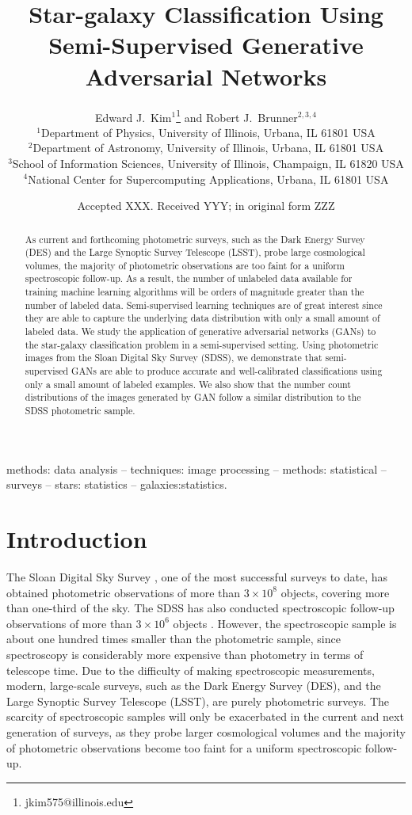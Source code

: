 \documentclass[fleqn,usenatbib]{mnras}
\title[Star-galaxy Classification Using GANs]{Star-galaxy Classification Using Semi-Supervised Generative Adversarial Networks}
\author[E. J. Kim and R. J. Brunner]{
  Edward J.~Kim$^1$\thanks{jkim575@illinois.edu} and Robert J.~Brunner$^{2,3,4}$ \\
$^1$Department of Physics, University of Illinois, Urbana, IL 61801 USA\\
$^2$Department of Astronomy, University of Illinois, Urbana, IL 61801 USA\\
$^3$School of Information Sciences, University of Illinois, Champaign, IL 61820 USA\\
$^4$National Center for Supercomputing Applications, Urbana, IL 61801 USA\\
}
\date{Accepted XXX. Received YYY; in original form ZZZ}
\begin{document}
\label{firstpage}
\pagerange{\pageref{firstpage}--\pageref{lastpage}}
\maketitle

\begin{abstract}
As current and forthcoming photometric surveys, such as the Dark Energy Survey (DES) and the Large Synoptic Survey Telescope (LSST),
probe large cosmological volumes, the majority of photometric observations are too faint for a uniform spectroscopic follow-up.
As a result, the number of unlabeled data available for training machine learning algorithms will be orders of magnitude
greater than the number of labeled data.
Semi-supervised learning techniques are of great interest since they are able to capture the underlying data distribution
with only a small amount of labeled data.
We study the application of generative adversarial networks (GANs) to the star-galaxy classification problem
in a semi-supervised setting.
Using photometric images from the Sloan Digital Sky Survey (SDSS), we demonstrate that semi-supervised GANs are able to produce
accurate and well-calibrated classifications using only a small amount of labeled examples.
We also show that the number count distributions of the images generated by GAN follow a similar distribution to
the SDSS photometric sample.
\end{abstract}

\begin{keywords}
methods: data analysis -- techniques: image processing -- methods: statistical
-- surveys -- stars: statistics -- galaxies:statistics.
\end{keywords}

\section{Introduction}
  \label{sec:introduction}

The Sloan Digital Sky Survey \citep[SDSS;][]{york2000sloan}, one of the most successful surveys to date,
has obtained photometric observations of more than $3 \times 10^8$ objects, covering more than one-third of
the sky.
The SDSS has also conducted spectroscopic follow-up observations of more than $3 \times 10^6$
objects \citep{eisenstein2011sdss}.
However, the spectroscopic sample is about one hundred times smaller than the photometric sample,
since spectroscopy is considerably more expensive than photometry in terms of telescope time.
Due to the difficulty of making spectroscopic measurements,
modern, large-scale surveys, such as the Dark Energy Survey (DES),
and the Large Synoptic Survey Telescope (LSST), are purely photometric surveys.
The scarcity of spectroscopic samples will only be exacerbated in the current and next generation of surveys,
as they probe larger cosmological volumes and the majority of photometric observations become too faint
for a uniform spectroscopic follow-up.
\end{document}
